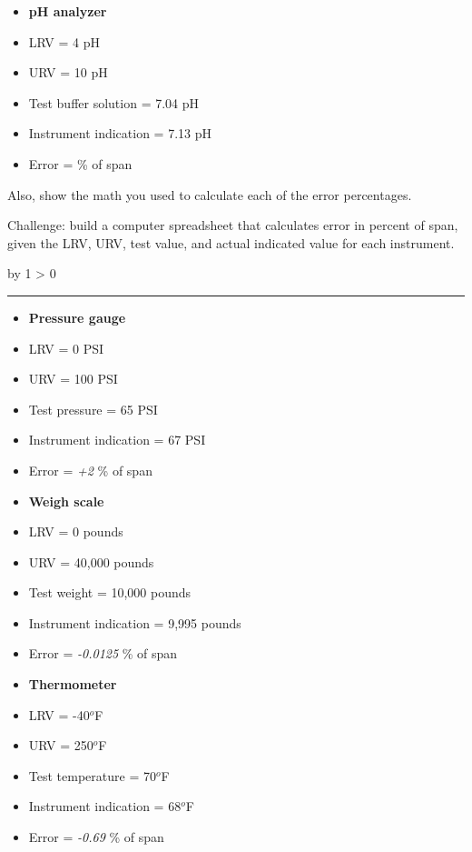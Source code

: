 \documentclass[12pt,a4paper]{article}
\def\svar{
           \advance\answnum by 1
           \ifnum \answnum > 0
                \hrule
                \vskip 3pt
                \leftline{Svar \the\answnum}
                \vskip 3pt \fi}
\begin{document}
\begin{itemize}
\item{} {\bf pH analyzer}
\item{} LRV = 4 pH
\item{} URV = 10 pH
\item{} Test buffer solution = 7.04 pH
\item{} Instrument indication = 7.13 pH
\item{} Error = \underbar{\hskip 50pt} \% of span
\end{itemize}

\vskip 10pt

Also, show the math you used to calculate each of the error percentages.

\vskip 10pt

Challenge: build a computer spreadsheet that calculates error in percent of span, given the LRV, URV, test value, and actual indicated value for each instrument.

\vskip 10pt \filbreak 





\svar{} 

\begin{itemize}
\item{} {\bf Pressure gauge}
\item{} LRV = 0 PSI
\item{} URV = 100 PSI 
\item{} Test pressure = 65 PSI 
\item{} Instrument indication = 67 PSI
\item{} Error = {\it +2} \% of span
\end{itemize}

\vskip 10pt

\begin{itemize}
\item{} {\bf Weigh scale}
\item{} LRV = 0 pounds
\item{} URV = 40,000 pounds
\item{} Test weight = 10,000 pounds
\item{} Instrument indication = 9,995 pounds
\item{} Error = {\it -0.0125} \% of span
\end{itemize}

\vskip 10pt

\begin{itemize}
\item{} {\bf Thermometer}
\item{} LRV = -40$^{o}$F
\item{} URV = 250$^{o}$F
\item{} Test temperature = 70$^{o}$F
\item{} Instrument indication = 68$^{o}$F
\item{} Error = {\it -0.69} \% of span
\end{itemize}
\end{document}
